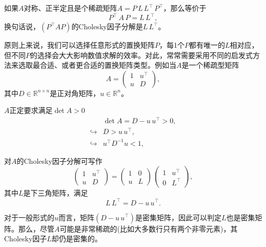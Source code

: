 \begin{subappendices}
如果$A$对称、正半定且是个稀疏矩阵$A = P \, L \, L^{\top} \, P^{\top}$，那么等价于
\begin{equation*}
  P^{\top} \, A \, P = L \, L^{\top},
\end{equation*}
换句话说，$\left( P^{\top} A P \right)$的Cholesky因子分解是$L \, L^{\top}$。

原则上来说，我们可以选择任意形式的置换矩阵$P$，每1个$P$都有唯一的$L$相对应，但不同$P$的选择会大大影响数值求解的效率。对此，常常需要采用不同的启发式方法来选取最合适、或者更合适的置换矩阵类型。例如当$A$是一个稀疏型矩阵
\begin{equation*}
  A = \begin{pmatrix}
  1 & u^{\top} \\ u & D
  \end{pmatrix},
\end{equation*}
其中$D \in \mathbb{R}^{n \times n}$是正对角矩阵，$u \in \mathbb{R}^{n}$。

$A$正定要求满足$\det A >0$
\begin{equation*}
  \begin{split}
    & \det A = D - u \, u^{\top} > 0, \\
    \hookrightarrow & D > u \, u^{\top}, \\
    \hookrightarrow & u^{\top} D^{-1} u < 1,
  \end{split}
\end{equation*}

对$A$的Cholesky因子分解可写作
\begin{equation}
  \label{eq:umlin-factorization-cholesky-a}
  \begin{pmatrix}
    1 & u^{\top} \\ u &  D
  \end{pmatrix}
  = \begin{pmatrix}
  1 & 0 \\ u & L
  \end{pmatrix}
  \, \begin{pmatrix}
  1 & u^{\top} \\ 0 & L^{\top}
  \end{pmatrix},
\end{equation}
其中$L$是下三角矩阵，满足
\begin{equation*}
  L \, L^{\top} = D - u \, u^{\top}.
\end{equation*}

对于一般形式的$u$而言，矩阵$\left( D - u \, u^{\top} \right)$是密集矩阵，因此可以判定$L$也是密集矩阵。那么，尽管$A$可能是非常稀疏的(比如大多数行只有两个非零元素)，其Cholesky因子$L$却仍是密集的。


\end{subappendices}
